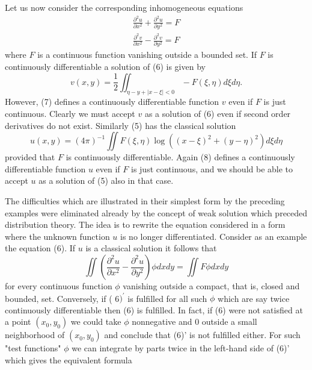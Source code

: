 Let us now consider the corresponding inhomogeneous equations
\begin{gather}
	 \frac{\partial^{2} u}{\partial x^{2}}+ \frac{\partial^{2} u}{\partial y^{2}}=F \\
	 \frac{\partial^{2} v}{\partial x^{2}}- \frac{\partial^{2} v}{\partial y^{2}}=F
\end{gather}
where $F$ is a continuous function vanishing outside a bounded set. If $F$ is continuously differentiable a solution of (6) is given by
\begin{equation}
	v(x, y)= \frac{1}{2}\iint_{\eta-y+|x-\xi|<0}-F(\xi, \eta) d \xi d \eta.
\end{equation}
However, (7) defines a continuously differentiable function $v$ even if $F$ is just continuous. Clearly we must accept $v$ as a solution of (6) even if second order derivatives do not exist. Similarly (5) has the classical solution
\begin{equation}
	u(x, y)=(4 \pi)^{-1} \iint F(\xi, \eta) \log \left((x-\xi)^{2}+(y-\eta)^{2}\right) d \xi d \eta
\end{equation}
provided that $F$ is continuously differentiable. Again (8) defines a continuously differentiable function $u$ even if $F$ is just continuous, and we should be able to accept $u$ as a solution of (5) also in that case.

The difficulties which are illustrated in their simplest form by the preceding examples were eliminated already by the concept of weak solution which preceded distribution theory. The idea is to rewrite the equation considered in a form where the unknown function $u$ is no longer differentiated. Consider as an example the equation (6). If $u$ is a classical solution it follows that
\begin{equation}
    \label{6'}
	\iint\left(\frac{\partial^{2} u}{\partial x^{2}}-\frac{\partial^{2} u}{\partial y^{2}}\right) \phi d x d y=\iint F \phi d x d y
\end{equation}
for every continuous function $\phi$ vanishing outside a compact, that is, closed and bounded, set. Conversely, if ( 6$)^{\prime}$ is fulfilled for all such $\phi$ which are say twice continuously differentiable then (6) is fulfilled. In fact, if (6) were not satisfied at a point $\left(x_{0}, y_{0}\right)$ we could take $\phi$ nonnegative and 0 outside a small neighborhood of $\left(x_{0}, y_{0}\right)$ and conclude that (6)' is not fulfilled either. For such "test functions" $\phi$ we can integrate by parts twice in the left-hand side of (6)' which gives the equivalent formula

